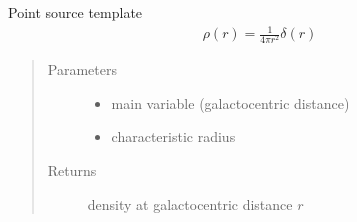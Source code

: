 \documentclass[letterpaper,10pt,english]{sphinxmanual}
\begin{document}
\begin{fulllineitems}
\label{\detokenize{diffsph.profiles:diffsph.profiles.templates.ps}}
\sphinxAtStartPar
Point source template
\begin{equation*}
\begin{split}\rho(r) = \frac1{4\pi r^2}\delta(r)\end{split}
\end{equation*}\begin{quote}\begin{description}
\item[{Parameters}] \leavevmode\begin{itemize}
\item {} 
\sphinxAtStartPar
{} \textendash{} main variable (galactocentric distance)

\item {} 
\sphinxAtStartPar
{} \textendash{} characteristic radius

\end{itemize}

\item[{Returns}] \leavevmode
\sphinxAtStartPar
density at galactocentric distance \(r\)

\end{description}\end{quote}

\end{fulllineitems}

\end{document}
